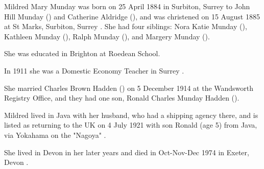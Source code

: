 
Mildred Mary Munday was born on 25 April 1884 in Surbiton, Surrey to  John Hill Munday () and Catherine Aldridge (), and was christened on 15 August 1885 at St Marks, Surbiton, Surrey \cite{MildredMaryMundayBirth}. She had four siblings:  Nora Katie Munday (),  Kathleen Munday (), Ralph Munday (), and Margery Munday ().

She was educated in Brighton at Roedean School.

In 1911 she was a Domestic Economy Teacher in Surrey \cite{MildredMundayOccupation}.

She married Charles Brown Hadden () on	5 December 1914  at the	Wandsworth Registry Office, and they had one son,  Ronald Charles Munday Hadden ().

Mildred lived in Java with her husband, who had a shipping agency there, and is listed as returning to the UK on 4 July 1921 with son Ronald (age 5) from Java, via Yokahama on the "Nagoya" \cite{MildredMundayTravel}.

She lived in Devon in her later years and died in Oct-Nov-Dec 1974 in	Exeter, Devon \cite{MildredMundayDeath}.
